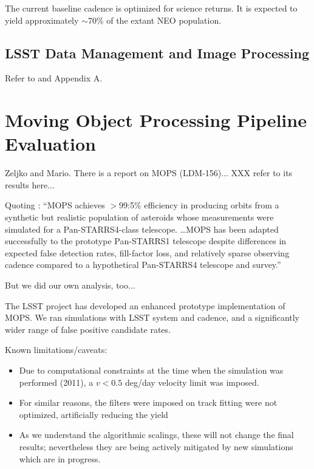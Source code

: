 \documentclass[12pt,preprint]{aastex}
\begin{document}
The current baseline cadence is optimized for science returns.
It is expected to yield approximately $\sim$70\% of the extant NEO population.


\subsection{LSST  Data Management and Image Processing} 

Refer to \cite{DM2016} and Appendix A. 






\section{Moving Object Processing Pipeline Evaluation}

Zeljko and Mario. There is a report on MOPS (LDM-156)...   XXX refer to its
results here... 

Quoting \cite{denneau13}: ``MOPS achieves $>$99:5\% efficiency in
producing orbits from a synthetic
but realistic population of asteroids whose measurements were
simulated for a Pan-STARRS4-class telescope. \dots MOPS has been
adapted successfully to the prototype Pan-STARRS1 telescope despite
differences in expected false detection rates, fill-factor loss, and
relatively sparse observing cadence compared to a hypothetical
Pan-STARRS4 telescope and survey.'' 

But we did our own analysis, too...

The LSST project has developed an enhanced prototype implementation of MOPS.
We ran simulations with LSST system and cadence, and a significantly
wider range of false positive candidate rates. 

Known limitations/caveats:
\begin{itemize}
\item Due to computational constraints at the time when the simulation
  was performed (2011), a $v < 0.5$ deg/day velocity limit was
  imposed.
\item For similar reasons, the filters were imposed on track fitting
  were not optimized, artificially reducing the yield
\item As we understand the algorithmic scalings, these will not change the
final results; nevertheless they are being actively mitigated by new
simulations which are in progress.
\end{itemize}
\end{document}
